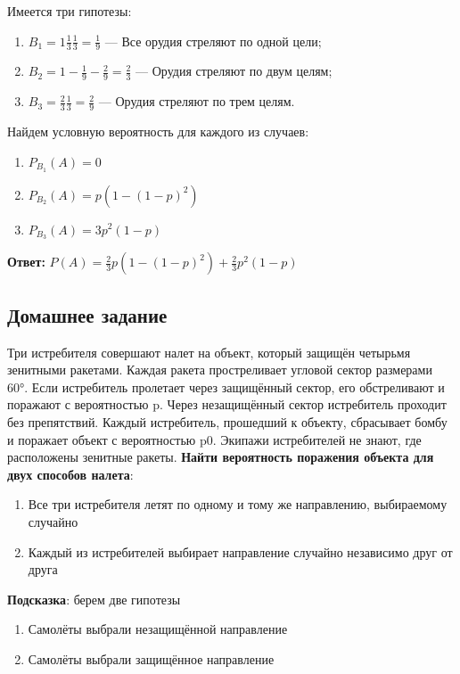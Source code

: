 \documentclass{article}
\begin{document}
Имеется три гипотезы:

\begin{enumerate}
    \item $B_1 = 1 \frac{1}{3} \frac{1}{3} = \frac{1}{9}$ — Все орудия стреляют по одной цели;
    \item $B_2 = 1 - \frac{1}{9} - \frac{2}{9} = \frac{2}{3}$ — Орудия стреляют по двум целям;
    \item $B_3 = \frac{2}{3} \frac{1}{3} = \frac{2}{9}$ — Орудия стреляют по трем целям.
\end{enumerate}

Найдем условную вероятность для каждого из случаев:

\begin{enumerate}
    \item $P_{B_1}(A) = 0$
    \item $P_{B_2}(A) = p (1 - (1 - p)^2)$
    \item $P_{B_3}(A) = 3p^2 (1 - p)$
\end{enumerate}

\textbf{Ответ:} $P(A) = \frac{2}{3} p (1 - (1 - p)^2) + \frac{2}{3} p^2 (1 - p)$

\subsection{Домашнее задание}

Три истребителя совершают налет на объект, который защищён четырьмя зенитными ракетами. Каждая ракета простреливает угловой сектор размерами 60°. Если истребитель пролетает через защищённый сектор, его обстреливают и поражают с вероятностью p. Через незащищённый сектор истребитель проходит без препятствий. Каждый истребитель, прошедший к объекту, сбрасывает бомбу и поражает объект с вероятностью p0. Экипажи истребителей не знают, где расположены зенитные ракеты. \textbf{Найти вероятность поражения объекта для двух способов налета}:

\begin{enumerate}
    \item Все три истребителя летят по одному и тому же направлению, выбираемому случайно
    \item Каждый из истребителей выбирает направление случайно независимо друг от друга
\end{enumerate}

\textbf{Подсказка}: берем две гипотезы

\begin{enumerate}
    \item Самолёты выбрали незащищённой направление
    \item Самолёты выбрали защищённое направление
\end{enumerate}
\end{document}
